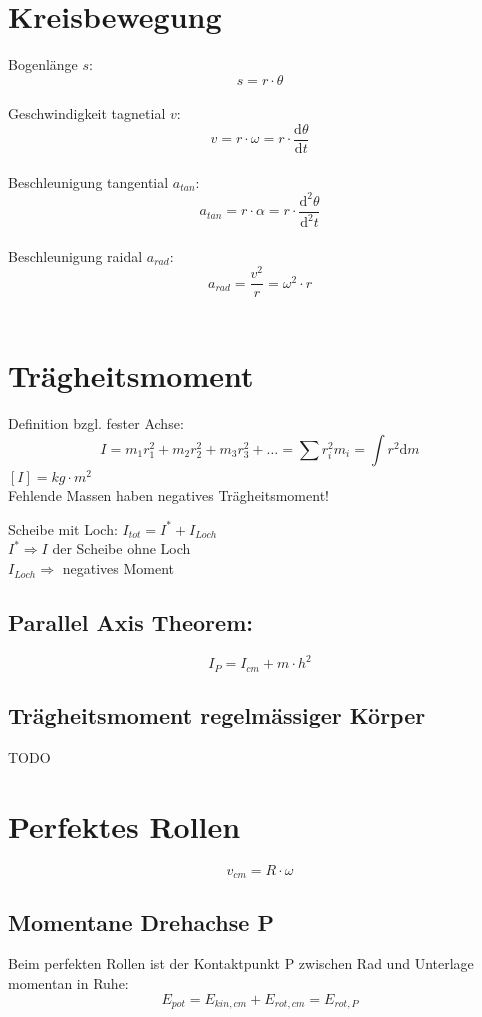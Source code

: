 \section{Kreisbewegung}
Bogenl\"ange $s$:
\[\boxed{s=r \cdot \theta} \]\\
Geschwindigkeit tagnetial $v$:
\[\boxed{v=r \cdot \omega=r\cdot\frac{\mathrm{d}\theta}{\mathrm{d}t}} \]\\
Beschleunigung tangential $a_{tan}$:
\[\boxed{a_{tan}=r \cdot \alpha=r\cdot\frac{\mathrm{d}^2\theta}{\mathrm{d}^2t}} \]\\
Beschleunigung raidal $a_{rad}$:
\[\boxed{a_{rad}=\frac{v^2}{r}=\omega^2\cdot r } \]\\

\section{Tr\"agheitsmoment}
Definition bzgl. fester Achse:
\[
	\boxed{
		I=m_1r_1^2+m_2r_2^2+m_3r_3^2+\ldots=\sum{r_i^2m_i}=\int{r^2\mathrm{d}m}
	}
\]
$[I]=kg\cdot m^2$\\
\newline
Fehlende Massen haben negatives Tr\"agheitsmoment!\\
\newline
\begin{footnotesize}
	Scheibe mit Loch: $I_{tot}=I^*+I_{Loch}$\\
	$I^*\Rightarrow I$ der Scheibe ohne Loch\\
	$I_{Loch}\Rightarrow$ negatives Moment
\end{footnotesize}

\subsection{Parallel Axis Theorem:}
\[
	\boxed{
		I_P=I_{cm}+m\cdot h^2
	}
\]

\subsection{Tr\"agheitsmoment regelm\"assiger K\"orper}
TODO

\section{Perfektes Rollen}
\[
	\boxed{
		v_{cm}=R\cdot \omega
	}
\]
\subsection{Momentane Drehachse P}
Beim perfekten Rollen ist der Kontaktpunkt P zwischen Rad und Unterlage momentan in Ruhe:
\[
	\boxed{
		E_{pot}=E_{kin,cm}+E_{rot,cm}=E_{rot,P}
	}
\]

